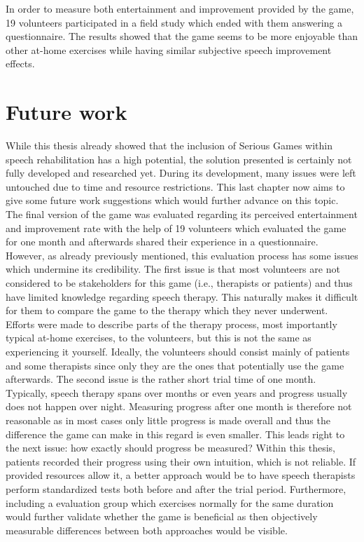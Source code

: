 \documentclass[draft,final]{vutinfth} %
\begin{document}
In order to measure both entertainment and improvement provided by the game, 19 volunteers participated in a field study which ended with them answering a questionnaire. The results showed that the game seems to be more enjoyable than other at-home exercises while having similar subjective speech improvement effects.

\section{Future work}
While this thesis already showed that the inclusion of Serious Games within speech rehabilitation has a high potential, the solution presented is certainly not fully developed and researched yet. During its development, many issues were left untouched due to time and resource restrictions. This last chapter now aims to give some future work suggestions which would further advance on this topic. \\

The final version of the game was evaluated regarding its perceived entertainment and improvement rate with the help of 19 volunteers which evaluated the game for one month and afterwards shared their experience in a questionnaire. However, as already previously mentioned, this evaluation process has some issues which undermine its credibility. The first issue is that most volunteers are not considered to be stakeholders for this game (i.e., therapists or patients) and thus have limited knowledge regarding speech therapy. This naturally makes it difficult for them to compare the game to the therapy which they never underwent. Efforts were made to describe parts of the therapy process, most importantly typical at-home exercises, to the volunteers, but this is not the same as experiencing it yourself. Ideally, the volunteers should consist mainly of patients and some therapists since only they are the ones that potentially use the game afterwards. The second issue is the rather short trial time of one month. Typically, speech therapy spans over months or even years and progress usually does not happen over night. Measuring progress after one month is therefore not reasonable as in most cases only little progress is made overall and thus the difference the game can make in this regard is even smaller. This leads right to the next issue: how exactly should progress be measured? Within this thesis, patients recorded their progress using their own intuition, which is not reliable. If provided resources allow it, a better approach would be to have speech therapists perform standardized tests both before and after the trial period. Furthermore, including a evaluation group which exercises normally for the same duration would further validate whether the game is beneficial as then objectively measurable differences between both approaches would be visible. \\
\end{document}

